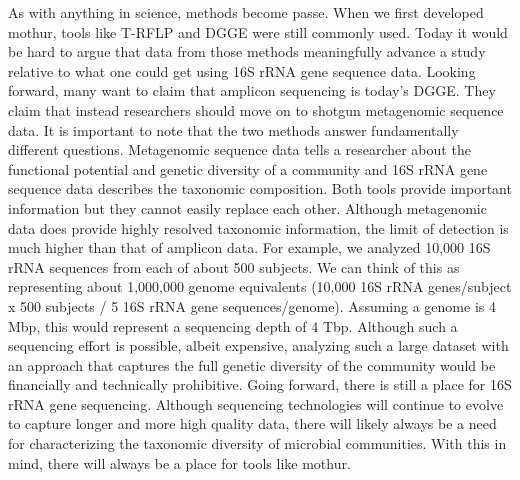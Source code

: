 \documentclass[11pt,]{article}
\begin{document}
As with anything in science, methods become passe. When we first
developed mothur, tools like T-RFLP and DGGE were still commonly used.
Today it would be hard to argue that data from those methods
meaningfully advance a study relative to what one could get using 16S
rRNA gene sequence data. Looking forward, many want to claim that
amplicon sequencing is today's DGGE. They claim that instead researchers
should move on to shotgun metagenomic sequence data. It is important to
note that the two methods answer fundamentally different questions.
Metagenomic sequence data tells a researcher about the functional
potential and genetic diversity of a community and 16S rRNA gene
sequence data describes the taxonomic composition. Both tools provide
important information but they cannot easily replace each other.
Although metagenomic data does provide highly resolved taxonomic
information, the limit of detection is much higher than that of amplicon
data. For example, we analyzed 10,000 16S rRNA sequences from each of
about 500 subjects. We can think of this as representing about 1,000,000
genome equivalents (10,000 16S rRNA genes/subject x 500 subjects / 5 16S
rRNA gene sequences/genome). Assuming a genome is 4 Mbp, this would
represent a sequencing depth of 4 Tbp. Although such a sequencing effort
is possible, albeit expensive, analyzing such a large dataset with an
approach that captures the full genetic diversity of the community would
be financially and technically prohibitive. Going forward, there is
still a place for 16S rRNA gene sequencing. Although sequencing
technologies will continue to evolve to capture longer and more high
quality data, there will likely always be a need for characterizing the
taxonomic diversity of microbial communities. With this in mind, there
will always be a place for tools like mothur.
\end{document}
